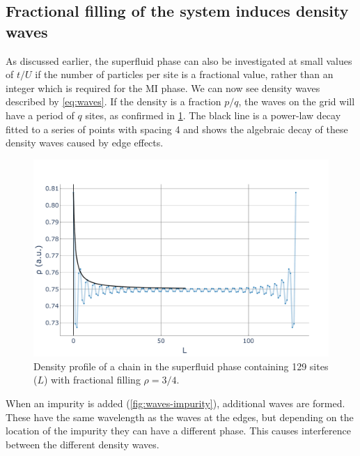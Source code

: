 \documentclass[twoside,twocolumn,9pt]{article}
\begin{document}
\subsection{Fractional filling of the system induces density waves}
As discussed earlier, the superfluid phase can also be investigated at small values of $t/U$ if the number of particles per site is a fractional value, rather than an integer which is required for the MI phase.  We can now see density waves described by \cref{eq:waves}. If the density is a fraction $p/q$, the waves on the grid will have a period of $q$ sites, as confirmed in \cref{fig:waves}. 
The black line is a power-law decay fitted to a series of points with spacing 4 and shows the algebraic decay of these density waves caused by edge effects. 
\begin{center}
  \begin{figure}
      \includegraphics[width=\linewidth]{../code/figures/Density-profiles-fractional-density.pdf}
      \caption{Density profile of a chain in the superfluid phase containing 129 sites ($L$) with fractional filling $\rho=3/4$.}
      \label{fig:waves}
  \end{figure}
\end{center}
When an impurity is added (\cref{fig:waves-impurity}), additional waves are formed. These have the same wavelength as the waves at the edges, but depending on the location of the impurity they can have a different phase. This causes interference between the different density waves. 
\end{document}
